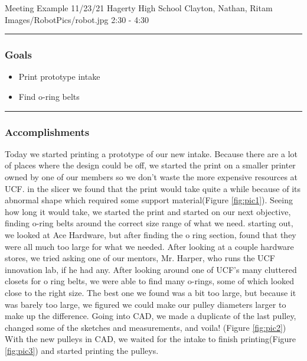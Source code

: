 \insertmeeting 
	{Meeting Example} 
	{11/23/21}
	{Hagerty High School}
	{Clayton, Nathan, Ritam}
	{Images/RobotPics/robot.jpg}
	{2:30 - 4:30}
	
\noindent\hfil\rule{\textwidth}{.4pt}\hfil
\subsubsection*{Goals}
\begin{itemize}
    \item Print prototype intake
    \item Find o-ring belts


\end{itemize} 

\noindent\hfil\rule{\textwidth}{.4pt}\hfil

\subsubsection*{Accomplishments}
Today we started printing a prototype of our new intake. Because there are a lot of places where the design could be off, we started the print on a smaller printer owned by one of our members so we don’t waste the more expensive resources at UCF. in the slicer we found that the print would take quite a while because of its abnormal shape which required some support material(Figure \ref{fig:pic1}). Seeing how long it would take, we started the print and started on our next objective, finding o-ring belts around the correct size range of what we need. starting out, we looked at Ace Hardware, but after finding the o ring section, found that they were all much too large for what we needed. After looking at a couple hardware stores, we tried asking one of our mentors, Mr. Harper, who runs the UCF innovation lab, if he had any. After looking around one of UCF’s many cluttered closets for o ring belts, we were able to find many o-rings, some of which looked close to the right size. The best one we found was a bit too large, but because it was barely too large, we figured we could make our pulley diameters larger to make up the difference. Going into CAD, we made a duplicate of the last pulley, changed some of the sketches and measurements, and voila! (Figure \ref{fig:pic2}) With the new pulleys in CAD, we waited for the intake to finish printing(Figure \ref{fig:pic3}) and started printing the pulleys.


